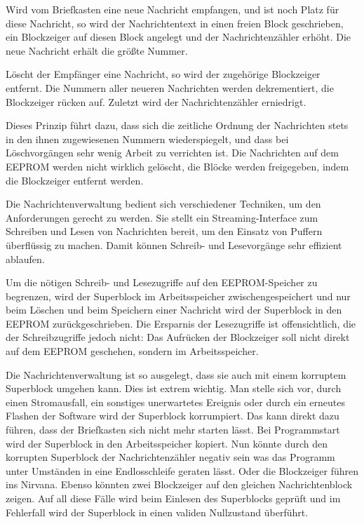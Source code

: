 \documentclass[ngerman]{article}
\begin{document}
Wird vom Briefkasten eine neue Nachricht  
empfangen, und ist noch Platz für diese Nachricht, so wird 
der Nachrichtentext in einen freien Block geschrieben,
ein Blockzeiger auf diesen Block angelegt und der Nachrichtenzähler
erhöht. Die neue Nachricht erhält die größte Nummer. 

Löscht der Empfänger eine Nachricht, so wird der zugehörige
Blockzeiger entfernt. Die Nummern aller neueren Nachrichten werden
dekrementiert, die Blockzeiger rücken auf. Zuletzt wird der
Nachrichtenzähler erniedrigt.

Dieses Prinzip führt dazu, dass sich die zeitliche Ordnung der
Nachrichten stets in den ihnen zugewiesenen Nummern wiederspiegelt,
und dass bei Löschvorgängen sehr wenig Arbeit zu verrichten ist. Die
Nachrichten auf dem EEPROM werden nicht wirklich gelöscht, die Blöcke
werden freigegeben, indem die Blockzeiger entfernt werden.

Die Nachrichtenverwaltung bedient sich verschiedener Techniken, um
den Anforderungen gerecht zu werden. Sie stellt ein Streaming-Interface
zum Schreiben und Lesen von Nachrichten bereit, um den Einsatz von
Puffern überflüssig zu machen. Damit können Schreib- und Lesevorgänge
sehr effizient ablaufen.

Um die nötigen Schreib- und Lesezugriffe auf den EEPROM-Speicher zu begrenzen, wird der Superblock im Arbeitsspeicher
zwischengespeichert und nur beim Löschen und beim Speichern einer Nachricht
wird der Superblock in den EEPROM zurückgeschrieben. Die Ersparnis der
Lesezugriffe ist offensichtlich, die der Schreibzugriffe jedoch nicht:
Das Aufrücken der Blockzeiger soll nicht direkt auf dem EEPROM geschehen,
sondern im Arbeitsspeicher.

Die Nachrichtenverwaltung ist so ausgelegt, dass sie auch mit
einem korruptem Superblock umgehen kann. Dies ist extrem wichtig. Man
stelle sich vor, durch einen Stromausfall, ein sonstiges unerwartetes Ereignis
oder durch ein erneutes Flashen der Software wird der Superblock korrumpiert.
Das kann direkt dazu führen, dass der Briefkasten sich nicht mehr starten
lässt. Bei Programmstart wird der Superblock in den Arbeitsspeicher kopiert.
Nun könnte durch den korrupten Superblock der Nachrichtenzähler negativ sein
was das Programm unter Umständen in eine Endlosschleife geraten lässt. Oder
die Blockzeiger führen ins Nirvana. Ebenso könnten zwei Blockzeiger auf
den gleichen Nachrichtenblock zeigen. Auf all diese Fälle wird beim Einlesen
des Superblocks geprüft und im Fehlerfall wird der Superblock in einen
validen Nullzustand überführt.
\end{document}
